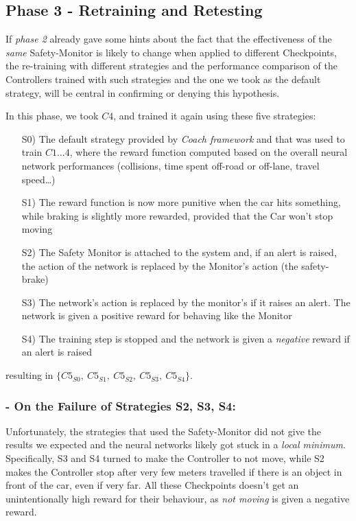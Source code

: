 \subsection{Phase 3 - Retraining and Retesting}

If \textsl{phase 2} already gave some hints about the fact that the effectiveness of the \textsl{same} Safety-Monitor is likely to change when applied to different Checkpoints, the re-training with different strategies and the performance comparison of the Controllers trained with such strategies and the one we took as the default strategy, will be central in confirming or denying this hypothesis.

In this phase, we took $C4$, and trained it again using these five strategies:

\begin{itemize}
	\item[S0)] The default strategy provided by \textsl{Coach framework} and that was used to train $C1\dots 4$, where the reward function computed based on the overall neural network performances (collisions, time spent off-road or off-lane, travel speed\dots)
	\item[S1)] The reward function is now more punitive when the car hits something, while braking is slightly more rewarded, provided that the Car won't stop moving
	\item[S2)] The Safety Monitor is attached to the system and, if an alert is raised, the action of the network is replaced by the Monitor's action (the safety-brake)
	\item[S3)] The network's action is replaced by the monitor's if it raises an alert. The network is given a positive reward for behaving like the Monitor
	\item[S4)] The training step is stopped and the network is given a \textsl{negative} reward if an alert is raised
\end{itemize}

resulting in $\{C5_{S0},\: C5_{S1},\: C5_{S2},\: C5_{S3},\: C5_{S4}\}$.



\subsubsection{- On the Failure of Strategies S2, S3, S4:}

Unfortunately, the strategies that used the Safety-Monitor did not give the results we expected and the neural networks likely got stuck in a \textsl{local minimum}. Specifically, S3 and S4 turned to make the Controller to not move, while S2 makes the Controller stop after very few meters travelled if there is an object in front of the car, even if very far. All these Checkpoints doesn't get an unintentionally high reward for their behaviour, as \textsl{not moving} is given a negative reward.

